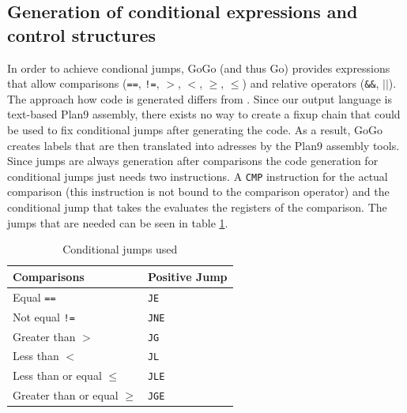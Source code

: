 \documentclass[a4paper]{scrartcl}
\let\section\subsection
\let\subsection\subsubsection
\let\subsubsection\paragraph
\let\paragraph\subparagraph
\let\subparagraph\undefined
\begin{document}
    \section{Generation of conditional expressions and control structures}
      In order to achieve condional jumps, GoGo (and thus Go) provides expressions 
      that allow comparisons (\texttt{==}, \texttt{!=}, \texttt{$>$}, \texttt{$<$},
      \texttt{$\ge$}, \texttt{$\le$}) and relative operators (\texttt{\&\&},
      \texttt{$||$}). The approach how code is generated differs from \cite{wir96}.
      Since our output language is text-based Plan9 assembly, there exists no way
      to create a fixup chain that could be used to fix conditional jumps after
      generating the code. As a result, GoGo creates labels that are then 
      translated into adresses by the Plan9 assembly tools. \\

      Since jumps are always generation after comparisons the code generation 
      for conditional jumps just needs two instructions. A \texttt{CMP} instruction
      for the actual comparison (this instruction is not bound to the comparison
      operator) and the conditional jump that takes the evaluates the registers
      of the comparison. The jumps that are needed can be seen in table \ref{tbl:jumps}.

      \begin{table}[htb]
        \centering
        \begin{tabular}{ll}
        \toprule
        \textbf{Comparisons} & \textbf{Positive Jump} \\
        \midrule
        Equal \texttt{==} & \texttt{JE}\\
        Not equal \texttt{!=} & \texttt{JNE}\\
        Greater than \texttt{$>$} & \texttt{JG}\\
        Less than \texttt{$<$} & \texttt{JL}\\
        Less than or equal \texttt{$\le$} & \texttt{JLE}\\
        Greater than or equal \texttt{$\ge$} & \texttt{JGE}\\
        \bottomrule
        \end{tabular}
        \caption{Conditional jumps used}
        \label{tbl:jumps}
      \end{table}
\end{document}
